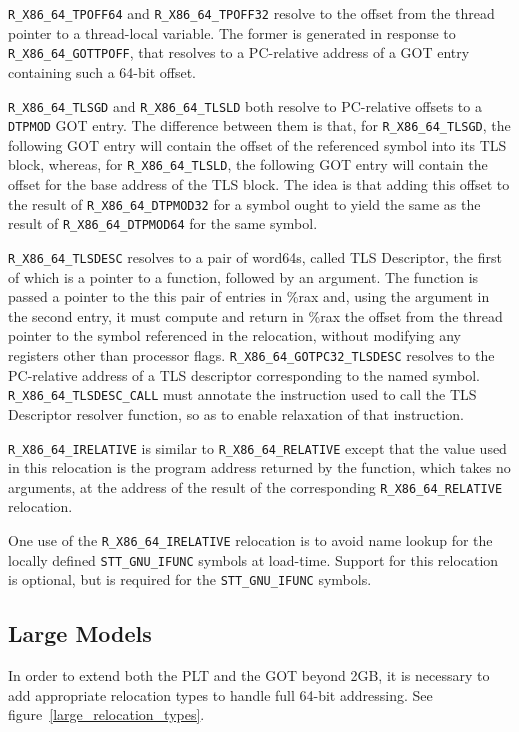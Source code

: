 \texttt{R_X86_64_TPOFF64} and \texttt{R_X86_64_TPOFF32} resolve to the
offset from the thread pointer to a thread-local variable.  The former
is generated in response to \texttt{R_X86_64_GOTTPOFF}, that resolves
to a PC-relative address of a GOT entry containing such a 64-bit
offset.

\texttt{R_X86_64_TLSGD} and \texttt{R_X86_64_TLSLD} both resolve to
PC-relative offsets to a \texttt{DTPMOD} GOT entry.  The difference
between them is that, for \texttt{R_X86_64_TLSGD}, the following GOT entry will
contain the offset of the referenced symbol into its TLS block,
whereas, for \texttt{R_X86_64_TLSLD}, the following GOT entry will contain the
offset for the base address of the TLS block.  The idea is that adding
this offset to the result of \texttt{R_X86_64_DTPMOD32} for a symbol ought to
yield the same as the result of \texttt{R_X86_64_DTPMOD64} for the same symbol.

\texttt{R_X86_64_TLSDESC} resolves to a pair of word64s, called TLS
Descriptor, the first of which is a pointer to a function, followed by
an argument.  The function is passed a pointer to the this pair of
entries in \%rax and, using the argument in the second entry, it must
compute and return in \%rax the offset from the thread pointer to the
symbol referenced in the relocation, without modifying any registers
other than processor flags.  \texttt{R_X86_64_GOTPC32_TLSDESC}
resolves to the PC-relative address of a TLS descriptor corresponding
to the named symbol.  \texttt{R_X86_64_TLSDESC_CALL} must annotate the
instruction used to call the TLS Descriptor resolver function, so as
to enable relaxation of that instruction.

\texttt{R_X86_64_IRELATIVE} is similar to \texttt{R_X86_64_RELATIVE}
except that the value used in this relocation is the program address
returned by the function, which takes no arguments, at the address of
the result of the corresponding \texttt{R_X86_64_RELATIVE} relocation.

One use of the \texttt{R_X86_64_IRELATIVE} relocation is to avoid name
lookup for the locally defined \texttt{STT_GNU_IFUNC} symbols at
load-time.  Support for this relocation is optional, but is required for
the \texttt{STT_GNU_IFUNC} symbols.

\subsection{Large Models}

In order to extend both the PLT and the GOT beyond 2GB, it
is necessary to add appropriate relocation types to handle
full 64-bit addressing.  See figure~\ref{large_relocation_types}.


